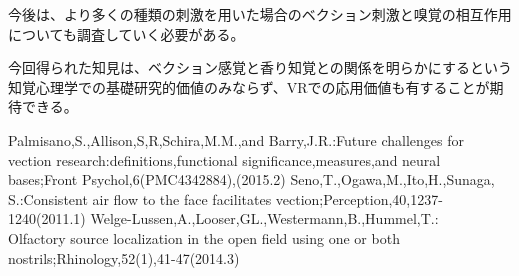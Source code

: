 \documentclass[uplatex]{jsarticle}   %
\begin{document}
今後は、より多くの種類の刺激を用いた場合のベクション刺激と嗅覚の相互作用についても調査していく必要がある。

今回得られた知見は、ベクション感覚と香り知覚との関係を明らかにするという知覚心理学での基礎研究的価値のみならず、VRでの応用価値も有することが期待できる。




\begin{thebibliography}{99}
  Palmisano,S.,Allison,S,R,Schira,M.M.,and Barry,J.R.:Future challenges for vection research:definitions,functional significance,measures,and neural bases;Front Psychol,6(PMC4342884),(2015.2)
  Seno,T.,Ogawa,M.,Ito,H.,Sunaga, S.:Consistent air flow to the face facilitates vection;Perception,40,1237-1240(2011.1)
  Welge-Lussen,A.,Looser,GL.,Westermann,B.,Hummel,T.:\\Olfactory source localization in the open field using one or both nostrils;Rhinology,52(1),41-47(2014.3)
\end{thebibliography}
 
%
%
\end{document}
